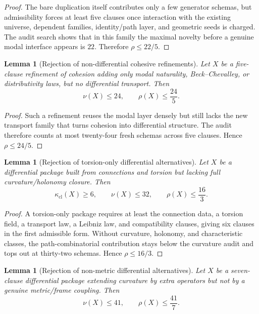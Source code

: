 \documentclass{lmcs}
\theoremstyle{plain}
\newtheorem{lem}[thm]{Lemma}
\theoremstyle{definition}
\theoremstyle{remark}
\begin{document}
\begin{proof}
The bare duplication itself contributes only a few generator schemas, but admissibility forces at least five clauses once interaction with the existing universe, dependent families, identity/path layer, and geometric seeds is charged.
The audit search shows that in this family the maximal novelty before a genuine modal interface appears is $22$.
Therefore $\rho\le 22/5$.
\end{proof}

\begin{lem}[Rejection of non-differential cohesive refinements]
\label{lem:reject-nondiff}
Let $X$ be a five-clause refinement of cohesion adding only modal naturality, Beck--Chevalley, or distributivity laws, but no differential transport.
Then
\[
  \nu(X)\le 24,\qquad \rho(X)\le \frac{24}{5}.
\]
\end{lem}

\begin{proof}
Such a refinement reuses the modal layer densely but still lacks the new transport family that turns cohesion into differential structure.
The audit therefore counts at most twenty-four fresh schemas across five clauses.
Hence $\rho\le 24/5$.
\end{proof}

\begin{lem}[Rejection of torsion-only differential alternatives]
\label{lem:reject-torsion}
Let $X$ be a differential package built from connections and torsion but lacking full curvature/holonomy closure.
Then
\[
  \kappa_{\mathrm{cl}}(X)\ge 6,\qquad \nu(X)\le 32,\qquad \rho(X)\le \frac{16}{3}.
\]
\end{lem}

\begin{proof}
A torsion-only package requires at least the connection data, a torsion field, a transport law, a Leibniz law, and compatibility clauses, giving six clauses in the first admissible form.
Without curvature, holonomy, and characteristic classes, the path-combinatorial contribution stays below the curvature audit and tops out at thirty-two schemas.
Hence $\rho\le 16/3$.
\end{proof}

\begin{lem}[Rejection of non-metric differential alternatives]
\label{lem:reject-nonmetric}
Let $X$ be a seven-clause differential package extending curvature by extra operators but not by a genuine metric/frame coupling.
Then
\[
  \nu(X)\le 41,\qquad \rho(X)\le \frac{41}{7}.
\]
\end{lem}
\end{document}
